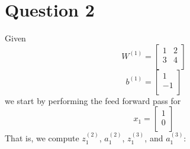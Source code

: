 \documentclass[leqno]{article}
\begin{document}
\section*{Question 2} Given 
\[
W^{(1)} =
  \begin{bmatrix}
  1 & 2\\
  3 & 4\\ 
  \end{bmatrix}
\]
\[
b^{(1)} =
  \begin{bmatrix}
  1 \\
  -1\\ 
  \end{bmatrix}
\]
we start by performing the feed forward pass for 
\[
x_1 =
  \begin{bmatrix}
  1\\
  0\\ 
  \end{bmatrix}
\]
That is, we compute $z_1^{(2)}$, $a_1^{(2)}$, $z_1^{(3)}$, and $a_1^{(3)}$:
\end{document}
